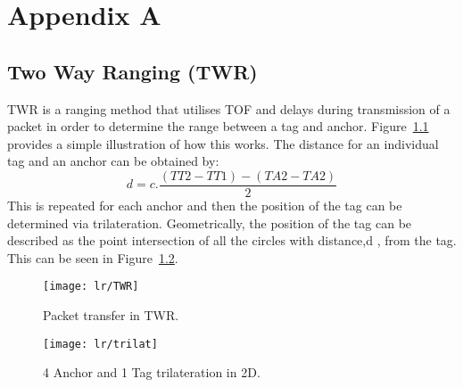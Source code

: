 %
%

\chapter{Appendix A}\label{app:app01}
\section*{Two Way Ranging (TWR)} %
TWR is a ranging method that utilises TOF and delays during transmission of a packet in order to determine the range between a tag and anchor.
Figure~\ref{fig:twr} provides a simple illustration of how this works.
The distance for an individual tag and an anchor can be obtained by:
\[
    d=c.\frac{(TT2-TT1)-(TA2-TA2)}{2}
\]
This is repeated for each anchor and then the position of the tag can be determined via trilateration.
Geometrically, the position of the tag can be described as the point intersection of all the circles with distance,d , from the tag.
This can be seen in Figure~\ref{fig:trilat}.
\begin{figure}[h!]
    \centering
    \texttt{[image: lr/TWR]}
    \caption{Packet transfer in TWR.}
    \label{fig:twr}
\end{figure}

\begin{figure}[h!]
    \centering
    \texttt{[image: lr/trilat]}
    \caption{4 Anchor and 1 Tag trilateration in 2D.}
    \label{fig:trilat}
\end{figure}
\newpage










